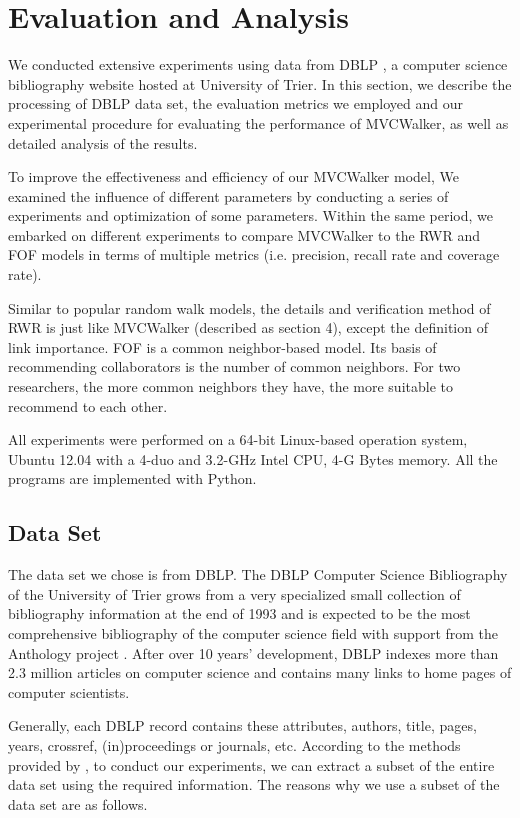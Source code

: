 \documentclass[10pt,journal,compsoc]{IEEEtran}
\begin{document}
\section{Evaluation and Analysis}
We conducted extensive experiments using data from DBLP \cite{Ley:DBLP}, a computer science bibliography website hosted at University of Trier. In this section, we describe the processing of DBLP data set, the evaluation metrics we employed and our experimental procedure for evaluating the performance of MVCWalker, as well as detailed analysis of the results.

To improve the effectiveness and efficiency of our MVCWalker model, We examined the influence of different parameters by conducting a series of experiments and optimization of some parameters. Within the same period, we embarked on different experiments to compare MVCWalker to the RWR and FOF models in terms of multiple metrics (i.e. precision, recall rate and coverage rate).

Similar to popular random walk models, the details and verification method of RWR is just like MVCWalker (described as section 4), except the definition of link importance. FOF is a common neighbor-based model. Its basis of recommending collaborators is the number of common neighbors. For two researchers, the more common neighbors they have, the more suitable to recommend to each other.

All experiments were performed on a 64-bit Linux-based operation system, Ubuntu 12.04 with a 4-duo and 3.2-GHz Intel CPU, 4-G Bytes memory. All the programs are implemented with Python.

\subsection{Data Set}

The data set we chose is from DBLP. The DBLP Computer Science Bibliography of the University of Trier grows from a very specialized small collection of bibliography information at the end of 1993 \cite{Ley:DBLP} and is expected to be the most comprehensive bibliography of the computer science field with support from the Anthology project \cite{Ley:DBLPEvolution}. After over 10 years' development, DBLP indexes more than 2.3 million articles on computer science and contains many links to home pages of computer scientists.

Generally, each DBLP record contains these attributes, authors, title, pages, years, crossref, (in)proceedings or journals, etc. According to the methods provided by \cite{Ley:DBLP}, to conduct our experiments, we can extract a subset of the entire data set using the required information. The reasons why we use a subset of the data set are as follows.
\end{document}
